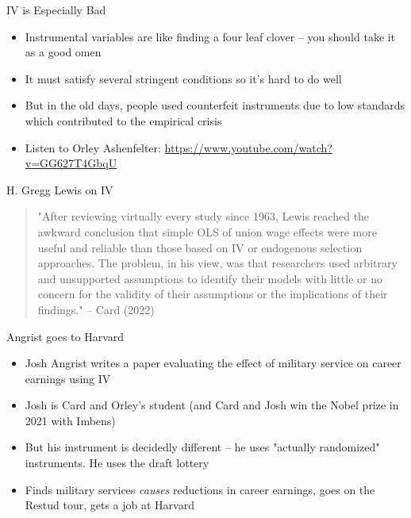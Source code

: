 \documentclass{beamer}
\begin{document}
\begin{frame}{IV is Especially Bad}
\begin{itemize}

\item Instrumental variables are like finding a four leaf clover -- you should take it as a good omen
\item It must satisfy several stringent conditions so it's hard to do well
\item But in the old days, people used counterfeit instruments due to low standards which contributed to the empirical crisis
\item Listen to Orley Ashenfelter: \url{https://www.youtube.com/watch?v=GG627T4GbqU}
  \end{itemize}

\end{frame}


\begin{frame}{H. Gregg Lewis on IV}

  \begin{quote}
    "After reviewing virtually every study since 1963, Lewis reached the awkward conclusion that simple OLS of union wage effects were more useful and reliable than those based on IV or endogenous selection approaches. The problem, in his view, was that researchers used arbitrary and unsupported assumptions to identify their models with little or no concern for the validity of their assumptions or the implications of their findings." -- Card (2022)
  \end{quote}

\end{frame}

\begin{frame}{Angrist goes to Harvard}

\begin{itemize}

\item Josh Angrist writes a paper evaluating the effect of military service on career earnings using IV
\item Josh is Card and Orley's student (and Card and Josh win the Nobel prize in 2021 with Imbens)
\item But his instrument is decidedly different -- he uses "actually randomized" instruments.  He uses the draft lottery
\item Finds military services \emph{causes} reductions in career earnings, goes on the Restud tour, gets a job at Harvard

\end{itemize}

\end{frame}
\end{document}
